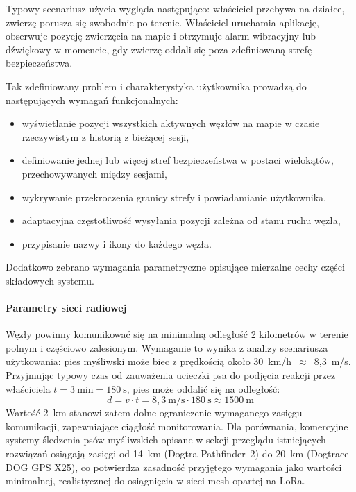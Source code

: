 Typowy scenariusz użycia wygląda następująco: właściciel przebywa na działce, zwierzę porusza się
swobodnie po terenie. Właściciel uruchamia aplikację, obserwuje pozycję zwierzęcia na mapie i otrzymuje
alarm wibracyjny lub dźwiękowy w momencie, gdy zwierzę oddali się poza zdefiniowaną strefę
bezpieczeństwa.


Tak zdefiniowany problem i charakterystyka użytkownika prowadzą do następujących wymagań funkcjonalnych:
\begin{itemize}
    \item wyświetlanie pozycji wszystkich aktywnych węzłów na mapie w czasie rzeczywistym
          z historią z bieżącej sesji,
    \item definiowanie jednej lub więcej stref bezpieczeństwa w postaci wielokątów,
          przechowywanych między sesjami,
    \item wykrywanie przekroczenia granicy strefy i powiadamianie użytkownika,
    \item adaptacyjna częstotliwość wysyłania pozycji zależna od stanu ruchu węzła,
    \item przypisanie nazwy i ikony do każdego węzła.
\end{itemize}

Dodatkowo zebrano wymagania parametryczne opisujące mierzalne cechy części składowych systemu.

\paragraph{Parametry sieci radiowej}
Węzły powinny komunikować się na minimalną odległość 2 kilometrów w terenie polnym i częściowo zalesionym.
Wymaganie to wynika z analizy scenariusza użytkowania: pies myśliwski może biec z prędkością
około 30~km/h~$\approx$~8,3~m/s. Przyjmując typowy czas od zauważenia ucieczki psa
do podjęcia reakcji przez właściciela $t = 3~\text{min} = 180~\text{s}$, pies może
oddalić się na odległość:
\begin{equation}
     d = v \cdot t = 8{,}3~\text{m/s} \cdot 180~\text{s} \approx 1500~\text{m}
\end{equation}
Wartość 2~km stanowi zatem dolne ograniczenie wymaganego zasięgu komunikacji,
zapewniające ciągłość monitorowania.
Dla porównania, komercyjne systemy śledzenia psów myśliwskich opisane w sekcji
przeglądu istniejących rozwiązań osiągają zasięgi od 14~km (Dogtra Pathfinder~2)
do 20~km (Dogtrace DOG GPS X25), co potwierdza zasadność przyjętego wymagania
jako wartości minimalnej, realistycznej do osiągnięcia w sieci mesh opartej na LoRa.

